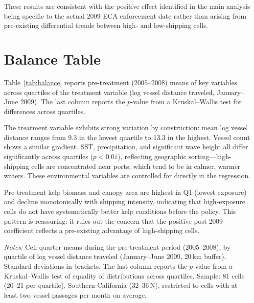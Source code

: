 \documentclass[12pt]{article}
\begin{document}
These results are consistent with the positive effect identified in the main analysis being specific to the actual 2009 ECA enforcement date rather than arising from pre-existing differential trends between high- and low-shipping cells.

\newpage

\section{Balance Table}\label{appendix_balance}

Table~\ref{tab:balance} reports pre-treatment (2005--2008) means of key variables across quartiles of the treatment variable (log vessel distance traveled, January--June 2009). The last column reports the $p$-value from a Kruskal--Wallis test for differences across quartiles.

The treatment variable exhibits strong variation by construction: mean log vessel distance ranges from 9.3 in the lowest quartile to 13.3 in the highest. Vessel count shows a similar gradient. SST, precipitation, and significant wave height all differ significantly across quartiles ($p<0.01$), reflecting geographic sorting---high-shipping cells are concentrated near ports, which tend to be in calmer, warmer waters. These environmental variables are controlled for directly in the regression.

Pre-treatment kelp biomass and canopy area are highest in Q1 (lowest exposure) and decline monotonically with shipping intensity, indicating that high-exposure cells do not have systematically better kelp conditions before the policy. This pattern is reassuring: it rules out the concern that the positive post-2009 coefficient reflects a pre-existing advantage of high-shipping cells.

\begin{table}[H]
  \centering
  \caption{Pre-treatment balance across treatment-intensity quartiles}
  \label{tab:balance}
  

  \vspace{0.5em}
  \begin{minipage}{\linewidth}
  \footnotesize
  \textit{Notes:} Cell-quarter means during the pre-treatment period (2005--2008), by quartile of log vessel distance traveled (January--June 2009, 20\,km buffer). Standard deviations in brackets. The last column reports the $p$-value from a Kruskal--Wallis test of equality of distributions across quartiles. Sample: 81 cells (20--21 per quartile), Southern California (32\textdegree--36\textdegree\,N), restricted to cells with at least two vessel passages per month on average.
  \end{minipage}
\end{table}
\end{document}
